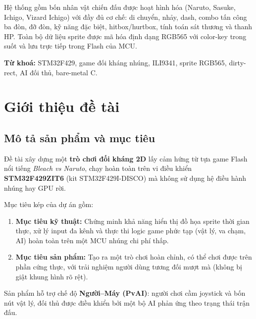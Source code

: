 \documentclass[a4paper,12pt]{report}
\begin{document}
Hệ thống gồm bốn nhân vật chiến đấu được hoạt hình hóa (Naruto, Sasuke, Ichigo, Vizard Ichigo) với đầy đủ cơ chế: di chuyển, nhảy, dash, combo tấn công ba đòn, đỡ đòn, kỹ năng đặc biệt, hitbox/hurtbox, tính toán sát thương và thanh HP. Toàn bộ dữ liệu sprite được mã hóa định dạng RGB565 với color-key trong suốt và lưu trực tiếp trong Flash của MCU.

\textbf{Từ khoá:} STM32F429, game đối kháng nhúng, ILI9341, sprite RGB565, dirty-rect, AI đối thủ, bare-metal C.

\newpage

\tableofcontents
\newpage
\listoffigures
\listoftables
\newpage

\chapter{Giới thiệu đề tài}

\section{Mô tả sản phẩm và mục tiêu}

Đề tài xây dựng một \textbf{trò chơi đối kháng 2D} lấy cảm hứng từ tựa game Flash nổi tiếng \textit{Bleach vs Naruto}, chạy hoàn toàn trên vi điều khiển \textbf{STM32F429ZIT6} (kit STM32F429I-DISCO) mà không sử dụng hệ điều hành nhúng hay GPU rời.

Mục tiêu kép của dự án gồm:
\begin{enumerate}[label=\arabic*)]
    \item \textbf{Mục tiêu kỹ thuật:} Chứng minh khả năng hiển thị đồ họa sprite thời gian thực, xử lý input đa kênh và thực thi logic game phức tạp (vật lý, va chạm, AI) hoàn toàn trên một MCU nhúng chi phí thấp.
    \item \textbf{Mục tiêu sản phẩm:} Tạo ra một trò chơi hoàn chỉnh, có thể chơi được trên phần cứng thực, với trải nghiệm người dùng tương đối mượt mà (không bị giật khung hình rõ rệt).
\end{enumerate}

Sản phẩm hỗ trợ chế độ \textbf{Người--Máy (PvAI)}: người chơi cầm joystick và bốn nút vật lý, đối thủ được điều khiển bởi một bộ AI phản ứng theo trạng thái trận đấu.
\end{document}
